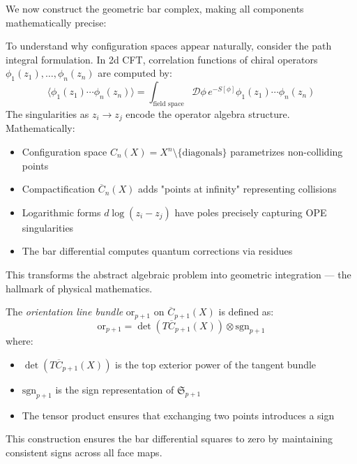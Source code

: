 We now construct the geometric bar complex, making all components mathematically precise:
 
\begin{remark}
To understand why configuration spaces appear naturally, consider the path integral formulation. In 2d CFT, correlation functions of chiral operators $\phi_1(z_1), \ldots, \phi_n(z_n)$ are computed by:
\[
\langle \phi_1(z_1) \cdots \phi_n(z_n) \rangle = \int_{\text{field space}} \mathcal{D}\phi \, e^{-S[\phi]} \phi_1(z_1) \cdots \phi_n(z_n)
\]
The singularities as $z_i \to z_j$ encode the operator algebra structure. Mathematically:
\begin{itemize}
\item Configuration space $C_n(X) = X^n \setminus \{\text{diagonals}\}$ parametrizes non-colliding points
\item Compactification $\overline{C}_n(X)$ adds "points at infinity" representing collisions
\item Logarithmic forms $d\log(z_i - z_j)$ have poles precisely capturing OPE singularities
\item The bar differential computes quantum corrections via residues
\end{itemize}
This transforms the abstract algebraic problem into geometric integration --- the hallmark of physical mathematics.
\end{remark}

\begin{definition}\label{def:orientation}
The \emph{orientation line bundle} $\text{or}_{p+1}$ on $\overline{C}_{p+1}(X)$ is defined as:
\[
\text{or}_{p+1} = \det(T\overline{C}_{p+1}(X)) \otimes \text{sgn}_{p+1}
\]
where:
\begin{itemize}
\item $\det(T\overline{C}_{p+1}(X))$ is the top exterior power of the tangent bundle
\item $\text{sgn}_{p+1}$ is the sign representation of $\mathfrak{S}_{p+1}$
\item The tensor product ensures that exchanging two points introduces a sign
\end{itemize}
This construction ensures the bar differential squares to zero by maintaining consistent signs across all face maps.
\end{definition}

